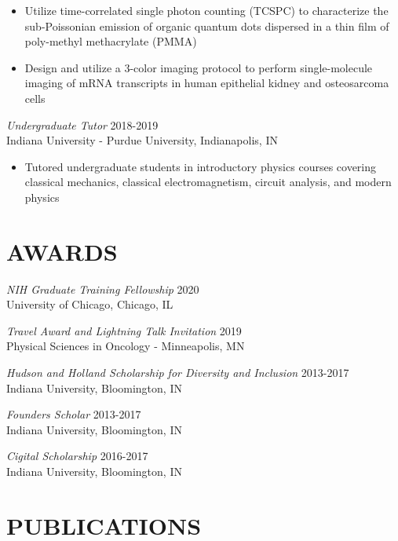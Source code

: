 \documentclass[margin, 10pt]{res} %
\begin{document}
\begin{resume}
\begin{itemize}
\item Utilize time-correlated single photon counting (TCSPC) to characterize the sub-Poissonian emission of organic quantum dots dispersed in a thin film of poly-methyl methacrylate (PMMA)

\item Design and utilize a 3-color imaging protocol to perform single-molecule imaging of mRNA transcripts in human epithelial kidney and osteosarcoma cells 

\end{itemize} 


{\sl Undergraduate Tutor} \hfill 2018-2019\\
Indiana University - Purdue University, Indianapolis, IN
\begin{itemize} \itemsep -2pt %

\item Tutored undergraduate students in introductory physics courses covering classical mechanics, classical electromagnetism, circuit analysis, and modern physics

\end{itemize} 



\section{AWARDS}

{\sl NIH Graduate Training Fellowship} \hfill 2020 \\
University of Chicago, Chicago, IL

{\sl Travel Award and Lightning Talk Invitation} \hfill 2019 \\
Physical Sciences in Oncology - Minneapolis, MN

{\sl Hudson and Holland Scholarship for Diversity and Inclusion} \hfill 2013-2017 \\
Indiana University, Bloomington, IN 

{\sl Founders Scholar} \hfill 2013-2017 \\
Indiana University, Bloomington, IN 

{\sl Cigital Scholarship} \hfill 2016-2017 \\
Indiana University, Bloomington, IN 

\section{PUBLICATIONS}


\end{resume}
\end{document}
